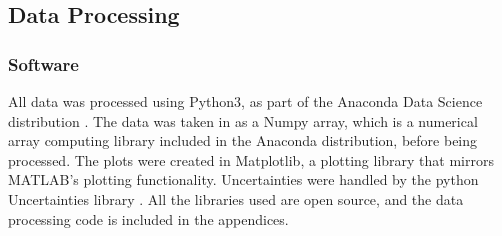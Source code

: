 \documentclass[11pt, oneside]{article}   	%
\begin{document}
\subsection{Data Processing}
\subsubsection{Software}
All data was processed using Python3, as part of the Anaconda Data Science distribution \cite{Anaconda}. The data was taken in as a Numpy array, which is a numerical array computing library included in the Anaconda distribution, before being processed. The plots were created in Matplotlib, a plotting library that mirrors MATLAB's plotting functionality. Uncertainties were handled by the python Uncertainties library \cite{Uncertainties}. All the libraries used are open source, and the data processing code is included in the appendices.
\end{document}
